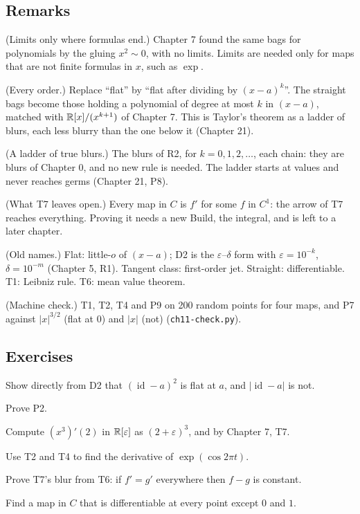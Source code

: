 \subsection*{Remarks}

\begin{lines}
\item[\lab{R1}] (Limits only where formulas end.) Chapter 7 found the same bags for polynomials by the gluing $x^2 \sim 0$, with no limits. Limits are needed only for maps that are not finite formulas in $x$, such as $\exp$.
\item[\lab{R2}] (Every order.) Replace ``flat'' by ``flat after dividing by $(x - a)^k$''. The straight bags become those holding a polynomial of degree at most $k$ in $(x - a)$, matched with $\mathbb{R}[x]/(x^{k+1})$ of Chapter 7. This is Taylor's theorem as a ladder of blurs, each less blurry than the one below it (Chapter 21).
\item[\lab{R3}] (A ladder of true blurs.) The blurs of R2, for $k = 0, 1, 2, \dots$, each chain: they are blurs of Chapter 0, and no new rule is needed. The ladder starts at values and never reaches germs (Chapter 21, P8).
\item[\lab{R4}] (What T7 leaves open.) Every map in $C$ is $f'$ for some $f$ in $C^1$: the arrow of T7 reaches everything. Proving it needs a new Build, the integral, and is left to a later chapter.
\item[\lab{R5}] (Old names.) Flat: little-$o$ of $(x - a)$; D2 is the $\varepsilon$--$\delta$ form with $\varepsilon = 10^{-k}$, $\delta = 10^{-m}$ (Chapter 5, R1). Tangent class: first-order jet. Straight: differentiable. T1: Leibniz rule. T6: mean value theorem.
\item[\lab{R6}] (Machine check.) T1, T2, T4 and P9 on 200 random points for four maps, and P7 against $|x|^{3/2}$ (flat at $0$) and $|x|$ (not) (\texttt{ch11-check.py}).
\end{lines}

\subsection*{Exercises}

\begin{lines}
\item[\lab{E1}] Show directly from D2 that $(\operatorname{id} - a)^2$ is flat at $a$, and $|\operatorname{id} - a|$ is not.
\item[\lab{E2}] Prove P2.
\item[\lab{E3}] Compute $(x^3)'(2)$ in $\mathbb{R}[\varepsilon]$ as $(2 + \varepsilon)^3$, and by Chapter 7, T7.
\item[\lab{E4}] Use T2 and T4 to find the derivative of $\exp(\cos 2\pi t)$.
\item[\lab{E5}] Prove T7's blur from T6: if $f' = g'$ everywhere then $f - g$ is constant.
\item[\lab{E6}] Find a map in $C$ that is differentiable at every point except $0$ and $1$.
\end{lines}

